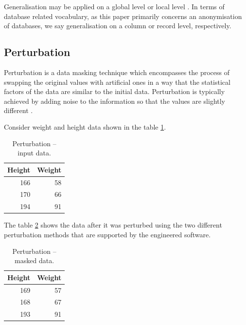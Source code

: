 \documentclass[a4paper,twoside,12pt]{book}
\begin{document}
Generalisation may be applied on a global level or local level \cite{bib:anonymization_extensive_study}. In terms of database related vocabulary, as this paper primarily concerns an anonymisation of databases, we say generalisation on a column or record level, respectively.

\subsection{Perturbation}

Perturbation is a data masking technique which encompasses the process of swapping the original values with artificial ones in a way that the statistical factors of the data are similar to the initial data. Perturbation is typically achieved by adding noise to the information so that the values are slightly different \cite{bib:anonymization_directory_structured}. 

Consider weight and height data shown in the table \ref{id:tab:perturbation_raw}.

\begin{table}[h]
\centering
\caption{Perturbation – input data.}
\label{id:tab:perturbation_raw}
\begin{tabular}{rr}
\toprule
Height & Weight \\ \midrule
166                        & 58                         \\
170                        & 66                         \\
194                        & 91                        \\ \bottomrule
\end{tabular}
\end{table}

The table \ref{id:tab:perturbation} shows the data after it was perturbed using the two different perturbation methods that are supported by the engineered software.

\begin{table}[h]
\centering
\caption{Perturbation – masked data.}
\label{id:tab:perturbation}
\begin{tabular}{rr}
\toprule
Height & Weight \\ \midrule
169                        & 57                         \\
168                        & 67                         \\
193                        & 91                        \\ \bottomrule
\end{tabular}
\end{table}
\end{document}
